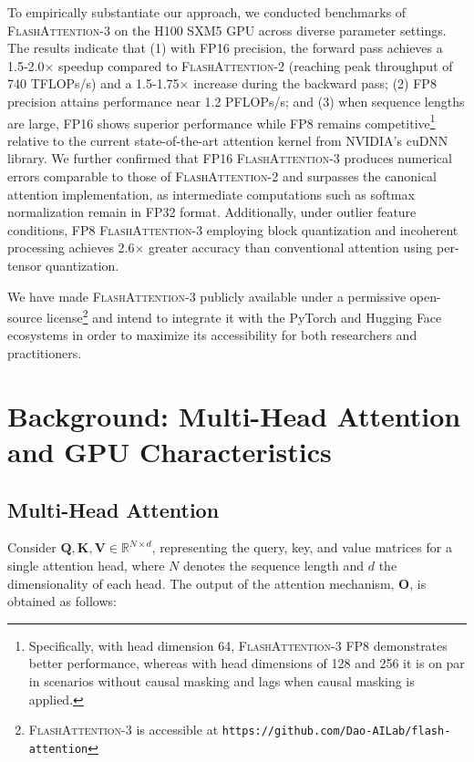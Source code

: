 To empirically substantiate our approach, we conducted benchmarks of \textsc{FlashAttention-3} on the H100 SXM5 GPU across diverse parameter settings. The results indicate that (1) with FP16 precision, the forward pass achieves a 1.5-2.0$\times$ speedup compared to \textsc{FlashAttention-2} (reaching peak throughput of 740 TFLOPs/s) and a 1.5-1.75$\times$ increase during the backward pass; (2) FP8 precision attains performance near 1.2 PFLOPs/s; and (3) when sequence lengths are large, FP16 shows superior performance while FP8 remains competitive\footnote{Specifically, with head dimension 64, \textsc{FlashAttention-3} FP8 demonstrates better performance, whereas with head dimensions of 128 and 256 it is on par in scenarios without causal masking and lags when causal masking is applied.} relative to the current state-of-the-art attention kernel from NVIDIA’s cuDNN library. We further confirmed that FP16 \textsc{FlashAttention-3} produces numerical errors comparable to those of \textsc{FlashAttention-2} and surpasses the canonical attention implementation, as intermediate computations such as softmax normalization remain in FP32 format. Additionally, under outlier feature conditions, FP8 \textsc{FlashAttention-3} employing block quantization and incoherent processing achieves 2.6$\times$ greater accuracy than conventional attention using per-tensor quantization.

We have made \textsc{FlashAttention-3} publicly available under a permissive open-source license\footnote{\textsc{FlashAttention-3} is accessible at \texttt{https://github.com/Dao-AILab/flash-attention}} and intend to integrate it with the PyTorch and Hugging Face ecosystems in order to maximize its accessibility for both researchers and practitioners.

\section{Background: Multi-Head Attention and GPU Characteristics}
\label{sec:background}

\subsection{Multi-Head Attention}
\label{subsec:multi_head_attn}

Consider $\mathbf{Q}, \mathbf{K}, \mathbf{V} \in \mathbb{R}^{N \times d}$, representing the query, key, and value matrices for a single attention head, where $N$ denotes the sequence length and $d$ the dimensionality of each head. The output of the attention mechanism, $\mathbf{O}$, is obtained as follows:

